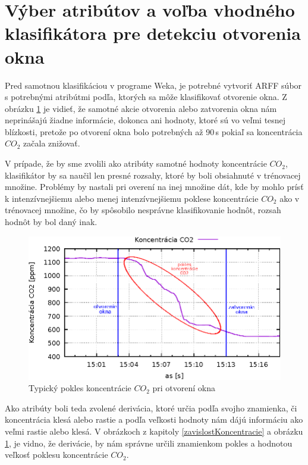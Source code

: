 \section{Výber atribútov a voľba vhodného klasifikátora pre detekciu otvorenia okna}\label{sectionOtvoreniOkna}
Pred samotnou klasifikáciou v programe Weka, je potrebné vytvoriť ARFF súbor s potrebnými atribútmi podľa, ktorých sa môže klasifikovať otvorenie okna. Z obrázku \ref{imgOtvorenieOkna} je vidieť, že samotné akcie otvorenia alebo zatvorenia okna nám neprinášajú žiadne informácie, dokonca ani hodnoty, ktoré sú vo veľmi tesnej blízkosti, pretože po otvorení okna bolo potrebných až 90\,s pokiaľ sa koncentrácia $CO_2$ začala znižovať.

V prípade, že by sme zvolili ako atribúty samotné hodnoty koncentrácie $CO_2$, klasifikátor by sa naučil len presné rozsahy, ktoré by boli obsiahnuté v trénovacej množine. Problémy by nastali pri overení na inej množine dát, kde by mohlo prísť k intenzívnejšiemu alebo menej intenzívnejšiemu poklese koncentrácie $CO_2$ ako v trénovacej množine, čo by spôsobilo nesprávne klasifikovanie hodnôt, rozsah hodnôt by bol daný inak.

\begin{figure}[H]
	\centering
	\includegraphics[width=350pt]{images/vyberParametrov.eps} 
	\caption{Typický pokles koncentrácie $CO_2$ pri otvorení okna}
	\label{imgOtvorenieOkna}
\end{figure}

Ako atribúty boli teda zvolené derivácia, ktoré určia podľa svojho znamienka, či koncentrácia klesá alebo rastie a podľa veľkosti hodnoty nám dájú informáciu ako veľmi rastie alebo klesá. V obrázkoch z kapitoly \ref{zavislostKoncentracie} a obrázku \ref{imgOtvorenieOkna}, je vidno, že derivácie, by nám správne určili znamienkom pokles a hodnotou veľkosť poklesu koncentrácie $CO_2$.

